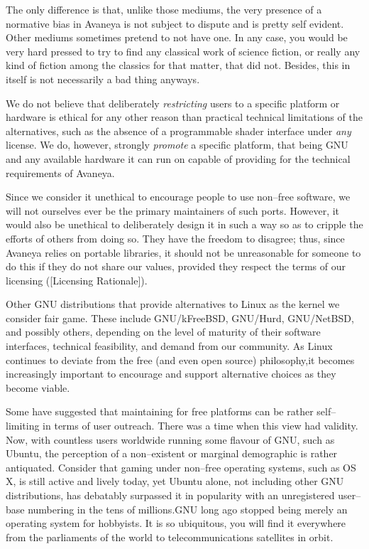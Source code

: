 The only difference is that, unlike those mediums, the very presence of a normative bias in Avaneya is not subject to dispute and is pretty self evident. Other mediums sometimes pretend to not have one. In any case, you would be very hard pressed to try to find any classical work of science fiction, or really any kind of fiction among the classics for that matter, that did not. Besides, this in itself is not necessarily a bad thing anyways.

We do not believe that deliberately {\it restricting} users to a specific platform or hardware is ethical for any other reason than practical technical limitations of the alternatives, such as the absence of a programmable shader interface under {\it any} license. We do, however, strongly {\it promote} a specific platform, that being GNU and any available hardware it can run on capable of providing for the technical requirements of Avaneya.

Since we consider it unethical to encourage people to use non--free software, we will not ourselves ever be the primary maintainers of such ports. However, it would also be unethical to deliberately design it in such a way so as to cripple the efforts of others from doing so. They have the freedom to disagree; thus, since Avaneya relies on portable libraries, it should not be unreasonable for someone to do this if they do not share our values, provided they respect the terms of our licensing ([Licensing Rationale]).

Other GNU distributions that provide alternatives to Linux as the kernel we consider fair game. These include GNU/kFreeBSD, GNU/Hurd, GNU/NetBSD, and possibly others, depending on the level of maturity of their software interfaces, technical feasibility, and demand from our community. As Linux continues to deviate from the free (and even open source) philosophy, it becomes increasingly important to encourage and support alternative choices as they become viable.

Some have suggested that maintaining for free platforms can be rather self--limiting in terms of user outreach. There was a time when this view had validity. Now, with countless users worldwide running some flavour of GNU, such as Ubuntu, the perception of a non--existent or marginal demographic is rather antiquated. Consider that gaming under non--free operating systems, such as OS X, is still active and lively today, yet Ubuntu alone, not including other GNU distributions, has debatably surpassed it in popularity with an unregistered user--base numbering in the tens of millions. GNU long ago stopped being merely an operating system for hobbyists. It is so ubiquitous, you will find it everywhere from the parliaments of the world to telecommunications satellites in orbit.

\StopChapter

